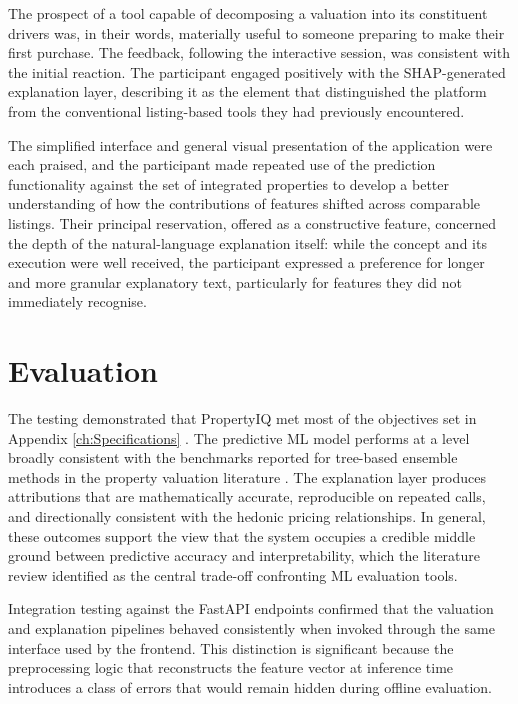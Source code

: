 The prospect of a tool capable of decomposing a valuation into its constituent drivers was, in their words, materially useful to someone preparing to make their first purchase.
The feedback, following the interactive session, was consistent with the initial reaction. The participant engaged positively with the SHAP-generated explanation layer, describing it as the element that distinguished the platform from the conventional listing-based tools they had previously encountered. 

The simplified interface and general visual presentation of the application were each praised, and the participant made repeated use of the prediction functionality against the set of integrated properties to develop a better understanding of how the contributions of features shifted across comparable listings. Their principal reservation, offered as a constructive feature, concerned the depth of the natural-language explanation itself: while the concept and its execution were well received, the participant expressed a preference for longer and more granular explanatory text, particularly for features they did not immediately recognise.


\section{Evaluation}

The testing demonstrated that PropertyIQ met most of the objectives set in Appendix \ref{ch:Specifications} . The predictive ML model performs at a level broadly consistent with the benchmarks reported for tree-based ensemble methods in the property valuation literature \parencite{Ho2020} \parencite{Rico-Juan2021}.
The explanation layer produces attributions that are mathematically accurate, reproducible on repeated calls, and directionally consistent with the hedonic pricing relationships. In general, these outcomes support the view that the system occupies a credible middle ground between predictive accuracy and interpretability, which the literature review identified as the central trade-off confronting ML evaluation tools.

Integration testing against the FastAPI endpoints confirmed that the valuation and explanation pipelines behaved consistently when invoked through the same interface used by the frontend. This distinction is significant because the preprocessing logic that reconstructs the feature vector at inference time introduces a class of errors that would remain hidden during offline evaluation. 

